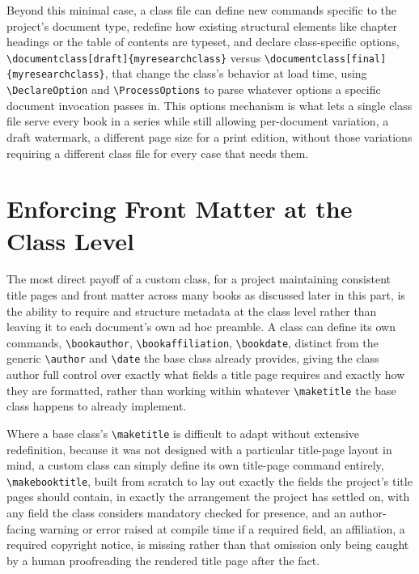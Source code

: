 Beyond this minimal case, a class file can define new commands specific to the project's document type, redefine how existing structural elements like chapter headings or the table of contents are typeset, and declare class-specific options, \texttt{\textbackslash{}documentclass{[}draft{]}\{myresearchclass\}} versus \texttt{\textbackslash{}documentclass{[}final{]}\{myresearchclass\}}, that change the class's behavior at load time, using \texttt{\textbackslash{}DeclareOption} and \texttt{\textbackslash{}ProcessOptions} to parse whatever options a specific document invocation passes in. This options mechanism is what lets a single class file serve every book in a series while still allowing per-document variation, a draft watermark, a different page size for a print edition, without those variations requiring a different class file for every case that needs them.

\hypertarget{enforcing-front-matter-at-the-class-level}{%
\section{Enforcing Front Matter at the Class Level}\label{enforcing-front-matter-at-the-class-level}}

The most direct payoff of a custom class, for a project maintaining consistent title pages and front matter across many books as discussed later in this part, is the ability to require and structure metadata at the class level rather than leaving it to each document's own ad hoc preamble. A class can define its own commands, \texttt{\textbackslash{}bookauthor}, \texttt{\textbackslash{}bookaffiliation}, \texttt{\textbackslash{}bookdate}, distinct from the generic \texttt{\textbackslash{}author} and \texttt{\textbackslash{}date} the base class already provides, giving the class author full control over exactly what fields a title page requires and exactly how they are formatted, rather than working within whatever \texttt{\textbackslash{}maketitle} the base class happens to already implement.

Where a base class's \texttt{\textbackslash{}maketitle} is difficult to adapt without extensive redefinition, because it was not designed with a particular title-page layout in mind, a custom class can simply define its own title-page command entirely, \texttt{\textbackslash{}makebooktitle}, built from scratch to lay out exactly the fields the project's title pages should contain, in exactly the arrangement the project has settled on, with any field the class considers mandatory checked for presence, and an author-facing warning or error raised at compile time if a required field, an affiliation, a required copyright notice, is missing rather than that omission only being caught by a human proofreading the rendered title page after the fact.

